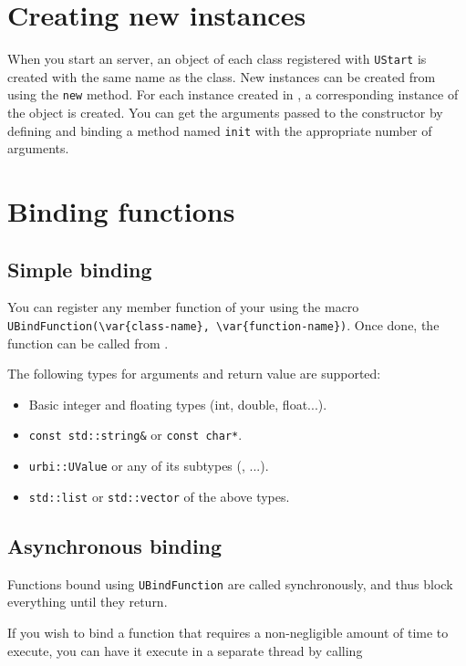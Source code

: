\section{Creating new instances}

When you start an \urbi server, an object of each class registered
with \lstinline{UStart} is created with the same name as the
class. New instances can be created from \urbi using the
\lstinline|new| method. For each instance created in \urbi, a
corresponding instance of the \Cxx object is created. You can get the
arguments passed to the constructor by defining and binding a method
named \lstinline|init| with the appropriate number of arguments.

\section{Binding functions}

\subsection{Simple binding}

You can register any member function of your \UObject using the macro
\lstinline|UBindFunction(\var{class-name}, \var{function-name})|. Once
done, the function can be called from \us.

The following types for arguments and return value are supported:

\begin{itemize}
\item Basic integer and floating types (int, double, float...).
\item \lstinline{const std::string&} or \lstinline{const char*}.
\item \lstinline{urbi::UValue} or any of its subtypes (\UBinary, \UList...).
\item \lstinline{std::list} or \lstinline{std::vector} of the above types.
\end{itemize}

\subsection{Asynchronous binding}
Functions bound using \lstinline{UBindFunction} are called synchronously, and
thus block everything until they return.

If you wish to bind a function that requires a non-negligible amount of time
to execute, you can have it execute in a separate thread by calling

